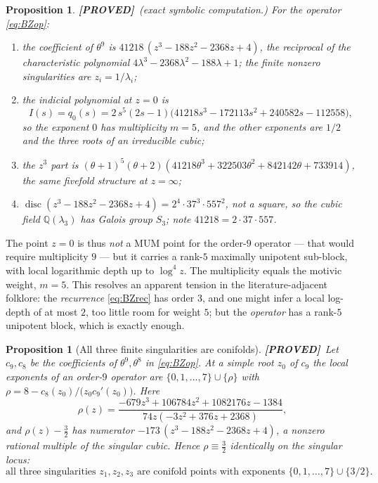 \documentclass[11pt,reqno]{amsart}
\theoremstyle{plain}
\newtheorem{proposition}[theorem]{Proposition}
\theoremstyle{definition}
\theoremstyle{remark}
\newcommand{\PROVED}{{\normalfont\sffamily\bfseries[PROVED]}}
\newcommand{\QQ}{\mathbb{Q}}
\DeclareMathOperator{\Disc}{disc}
\begin{document}
\begin{proposition}\label{prop:local} \PROVED\ (exact symbolic computation.)
For the operator \eqref{eq:BZop}:
\begin{enumerate}[label=(\roman*),leftmargin=2.2em]
\item the coefficient of $\theta^{9}$ is $41218\,(z^3-188z^2-2368z+4)$, the reciprocal of the
characteristic polynomial $4\lambda^3-2368\lambda^2-188\lambda+1$; the finite nonzero
singularities are $z_i=1/\lambda_i$;
\item the indicial polynomial at $z=0$ is
\[
  I(s)=q_0(s)=2\,s^{5}(2s-1)\bigl(41218s^3-172113s^2+240582s-112558\bigr),
\]
so the exponent $0$ has multiplicity $m=5$, and the other exponents are $1/2$ and the three
roots of an irreducible cubic;
\item the $z^3$ part is $(\theta+1)^5(\theta+2)(41218\theta^3+322503\theta^2+842142\theta+733914)$,
the same fivefold structure at $z=\infty$;
\item $\Disc(z^3-188z^2-2368z+4)=2^4\cdot 37^3\cdot 557^2$, not a square, so the cubic field
$\QQ(\lambda_3)$ has Galois group $S_3$; note $41218=2\cdot37\cdot557$.
\end{enumerate}
\end{proposition}

The point $z=0$ is thus \emph{not} a MUM point for the order-$9$ operator --- that would require
multiplicity $9$ --- but it carries a rank-$5$ maximally unipotent sub-block, with local
logarithmic depth up to $\log^4z$. The multiplicity equals the motivic weight,
$m=5$. This resolves an apparent tension in the literature-adjacent folklore: the
\emph{recurrence} \eqref{eq:BZrec} has order $3$, and one might infer a local log-depth of at
most $2$, too little room for weight $5$; but the \emph{operator} has a rank-$5$ unipotent block,
which is exactly enough.

\begin{proposition}[All three finite singularities are conifolds]\label{prop:conifold} \PROVED\
Let $c_9,c_8$ be the coefficients of $\theta^9,\theta^8$ in \eqref{eq:BZop}. At a simple root
$z_0$ of $c_9$ the local exponents of an order-$9$ operator are
$\{0,1,\dots,7\}\cup\{\rho\}$ with $\rho=8-c_8(z_0)/\bigl(z_0c_9'(z_0)\bigr)$. Here
\[
  \rho(z)=\frac{-679z^3+106784z^2+1082176z-1384}{74z(-3z^2+376z+2368)},
\]
and $\rho(z)-\tfrac32$ has numerator $-173\,(z^3-188z^2-2368z+4)$, a nonzero rational multiple
of the singular cubic. Hence $\rho\equiv\tfrac32$ identically on the singular locus:
\[
  \text{all three singularities }z_1,z_2,z_3\text{ are conifold points with exponents }
  \{0,1,\dots,7\}\cup\{3/2\}.
\]
\end{proposition}
\end{document}

